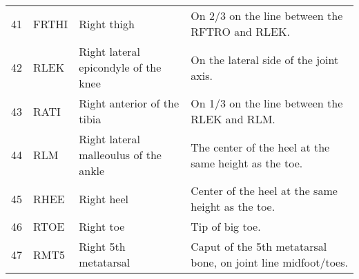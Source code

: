 \documentclass{article}
\begin{document}
\begin{table}
\begin{tabular}{rlll}
    41 & FRTHI & Right thigh & On 2/3 on the line between the RFTRO and RLEK. \\
    42 & RLEK & Right lateral epicondyle of the knee & On the lateral side of the joint axis. \\
    43 & RATI & Right anterior of the tibia & On 1/3 on the line between the RLEK and RLM. \\
    44 & RLM & Right lateral malleoulus of the ankle & The center of the heel at the same height as the toe. \\
    45 & RHEE & Right heel & Center of the heel at the same height as the toe. \\
    46 & RTOE & Right toe & Tip of big toe. \\
    47 & RMT5 & Right 5th metatarsal & Caput of the 5th metatarsal bone, on joint line midfoot/toes. \\
  \end{tabular}
  \label{tab:marker-labels}
\end{table}
\end{document}
